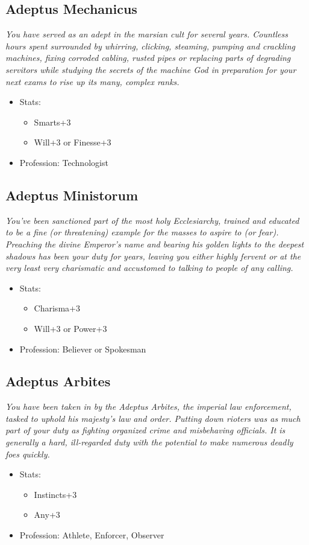	\subsection{Adeptus Mechanicus}
	\textit{You have served as an adept in the marsian cult for several years. Countless hours spent surrounded by whirring, clicking, steaming, pumping and crackling machines, fixing corroded cabling, rusted pipes or replacing parts of degrading servitors while studying the secrets of the machine God in preparation for your next exams to rise up its many, complex ranks. }
	\begin{itemize}
		\item Stats:
		\begin{itemize}
			\item Smarts+3
			\item Will+3 or Finesse+3
		\end{itemize}
		\item Profession: Technologist
	\end{itemize}

	\subsection{Adeptus Ministorum}
	\textit{You've been sanctioned part of the most holy Ecclesiarchy, trained and educated to be a fine (or threatening) example for the masses to aspire to (or fear). Preaching the divine Emperor's name and bearing his golden lights to the deepest shadows has been your duty for years, leaving you either highly fervent or at the very least very charismatic and accustomed to talking to people of any calling.}
	\begin{itemize}
		\item Stats:
		\begin{itemize}
			\item Charisma+3
			\item Will+3 or Power+3
		\end{itemize}
		\item Profession: Believer or Spokesman
	\end{itemize}

	\subsection{Adeptus Arbites}
	\textit{You have been taken in by the Adeptus Arbites, the imperial law enforcement, tasked to uphold his majesty's law and order. Putting down rioters was as much part of your duty as fighting organized crime and misbehaving officials. It is generally a hard, ill-regarded duty with the potential to make numerous deadly foes quickly.}
	\begin{itemize}
		\item Stats:
		\begin{itemize}
			\item Instincts+3
			\item Any+3
		\end{itemize}
		\item Profession: Athlete, Enforcer, Observer
	\end{itemize}

